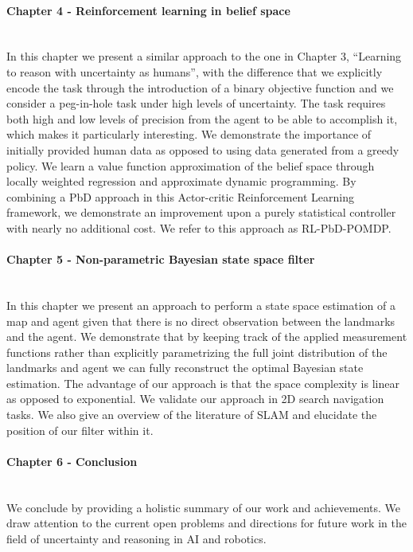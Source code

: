 \begin{minipage}[c]{0.9\textwidth}
\paragraph{Chapter 4 - Reinforcement learning in belief space}\\

In this chapter we present a similar approach to the one in Chapter 3, ``Learning to reason with uncertainty as humans'',
with the difference that we explicitly encode the task through the introduction of a binary objective function and we consider 
a peg-in-hole task under high levels of uncertainty. 
The task requires both high and low levels of precision from the agent to be able to accomplish it, which makes it particularly interesting. 
We demonstrate the importance of initially provided human data as opposed to using data generated from a greedy policy.
We learn a value function approximation of the belief space through locally weighted regression and approximate dynamic programming. By combining a PbD approach in this Actor-critic Reinforcement Learning framework, we demonstrate an improvement upon 
a purely statistical controller with nearly no additional cost. We refer to this approach as RL-PbD-POMDP. 
\end{minipage}

\begin{minipage}[c]{0.9\textwidth}
\paragraph{Chapter 5 - Non-parametric Bayesian state space filter}\\
In this chapter we present an approach to perform a state space estimation of a map and agent 
given that there is no direct observation between the landmarks and the agent. 
We demonstrate that by keeping track of the applied measurement functions rather than 
explicitly parametrizing the full joint distribution of the landmarks and agent we can fully reconstruct 
the optimal Bayesian state estimation. The advantage of our approach is that the space complexity is linear as opposed 
to exponential. We validate our approach in 2D search navigation tasks.
We also give an overview of the literature of SLAM and elucidate the position of our filter within it.
\end{minipage}

\begin{minipage}[c]{0.9\textwidth}
\paragraph{Chapter 6 - Conclusion}\\
We conclude by providing a holistic summary of our work and achievements. We draw attention to the current 
open problems and directions for future work in the field of uncertainty and reasoning in AI and robotics.
\end{minipage}








